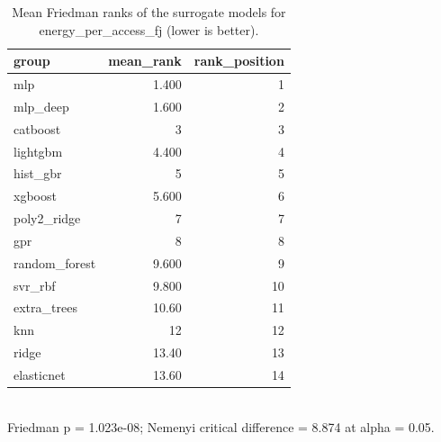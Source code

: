 \begin{table}[!t]
\centering
\caption{Mean Friedman ranks of the surrogate models for energy_per_access_fj (lower is better).}
\label{tab:statistics_surrogate_ranks_surrogate_energy_per_access_fj}
\footnotesize
\begin{tabular}{lrr}
\toprule
group & mean\_rank & rank\_position \\
\midrule
mlp & 1.400 & 1 \\
mlp\_deep & 1.600 & 2 \\
catboost & 3 & 3 \\
lightgbm & 4.400 & 4 \\
hist\_gbr & 5 & 5 \\
xgboost & 5.600 & 6 \\
poly2\_ridge & 7 & 7 \\
gpr & 8 & 8 \\
random\_forest & 9.600 & 9 \\
svr\_rbf & 9.800 & 10 \\
extra\_trees & 10.60 & 11 \\
knn & 12 & 12 \\
ridge & 13.40 & 13 \\
elasticnet & 13.60 & 14 \\
\bottomrule
\end{tabular}
\\[2pt] \footnotesize Friedman p = 1.023e-08; Nemenyi critical difference = 8.874 at alpha = 0.05.
\end{table}

